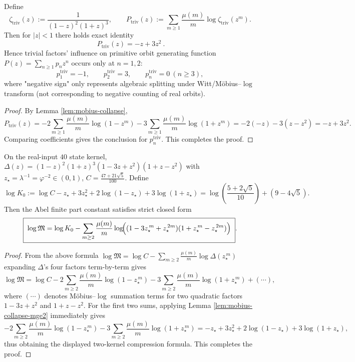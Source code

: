 \begin{proposition}\label{prop:triv-factor-primitive-polynomial}
Define
\[
\zeta_{\mathrm{triv}}(z):=\frac{1}{(1-z)^2(1+z)^3},
\qquad
P_{\mathrm{triv}}(z):=\sum_{m\ge 1}\frac{\mu(m)}{m}\log\zeta_{\mathrm{triv}}(z^m).
\]
Then for \(|z|<1\) there holds exact identity
\[
\boxed{\ P_{\mathrm{triv}}(z)=-z+3z^2\ }.
\]
Hence trivial factors' influence on primitive orbit generating function \(P(z)=\sum_{n\ge 1}p_n z^n\) occurs only at \(n=1,2\):
\[
p^{\mathrm{triv}}_1=-1,\qquad p^{\mathrm{triv}}_2=3,\qquad p^{\mathrm{triv}}_n=0\ (n\ge 3),
\]
where "negative sign" only represents algebraic splitting under Witt/Möbius--$\log$ transform (not corresponding to negative counting of real orbits).
\end{proposition}
\begin{proof}
By Lemma \ref{lem:mobius-collapse},
\[
P_{\mathrm{triv}}(z)
=-2\sum_{m\ge 1}\frac{\mu(m)}{m}\log(1-z^m)-3\sum_{m\ge 1}\frac{\mu(m)}{m}\log(1+z^m)
=-2(-z)-3(z-z^2)=-z+3z^2.
\]
Comparing coefficients gives the conclusion for \(p^{\mathrm{triv}}_n\). This completes the proof.
\end{proof}

\begin{proposition}\label{prop:real-input-40-mertens-two-series}
On the real-input $40$ state kernel,
\(
\Delta(z)=(1-z)^2(1+z)^3(1-3z+z^2)(1+z-z^2)
\)
with \(z_\star=\lambda^{-1}=\varphi^{-2}\in(0,1)\), \(C=\frac{47+21\sqrt5}{100}\).
Define
\[
\log K_0
:=\log C-z_\star+3z_\star^2+2\log(1-z_\star)+3\log(1+z_\star)
=\log\!\left(\frac{5+2\sqrt5}{10}\right)+(9-4\sqrt5).
\]
Then the Abel finite part constant satisfies strict closed form
\[
\boxed{\;
\log\mathfrak{M}
=
\log K_0
-\sum_{m\ge 2}\frac{\mu(m)}{m}
\log\!\Bigl(
(1-3z_\star^{\,m}+z_\star^{\,2m})(1+z_\star^{\,m}-z_\star^{\,2m})
\Bigr)\; }.
\]
\end{proposition}
\begin{proof}
From the above formula
\(
\log\mathfrak{M}
=\log C-\sum_{m\ge 2}\frac{\mu(m)}{m}\log \Delta(z_\star^{\,m})
\)
expanding \(\Delta\)'s four factors term-by-term gives
\[
\log\mathfrak{M}
=\log C
-2\sum_{m\ge 2}\frac{\mu(m)}{m}\log(1-z_\star^{\,m})
-3\sum_{m\ge 2}\frac{\mu(m)}{m}\log(1+z_\star^{\,m})+(\cdots),
\]
where \((\cdots)\) denotes Möbius--$\log$ summation terms for two quadratic factors \(1-3z+z^2\) and \(1+z-z^2\).
For the first two sums, applying Lemma \ref{lem:mobius-collapse-mge2} immediately gives
\[
-2\sum_{m\ge 2}\frac{\mu(m)}{m}\log(1-z_\star^{\,m})
-3\sum_{m\ge 2}\frac{\mu(m)}{m}\log(1+z_\star^{\,m})
=-z_\star+3z_\star^2+2\log(1-z_\star)+3\log(1+z_\star),
\]
thus obtaining the displayed two-kernel compression formula. This completes the proof.
\end{proof}

